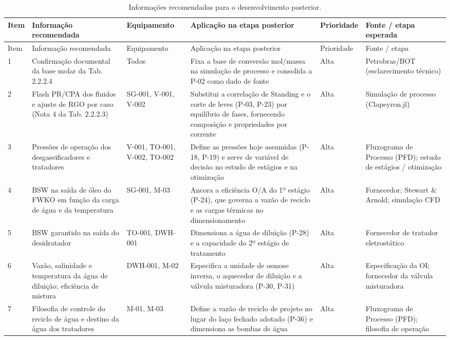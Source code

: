 \documentclass[11pt,a4paper]{article}
\numberwithin{equation}{section}
\numberwithin{table}{section}
\numberwithin{figure}{section}
\begin{document}
\begin{landscape}\small
\begin{longtable}{lL{6.0cm}L{2.9cm}L{5.2cm}lL{4.2cm}}
\caption{Informações recomendadas para o desenvolvimento posterior.}\label{tab:info}\\\toprule
Item & Informação recomendada & Equipamento & Aplicação na etapa posterior & Prioridade & Fonte / etapa esperada\\\midrule\endfirsthead
\toprule Item & Informação recomendada & Equipamento & Aplicação na etapa posterior & Prioridade & Fonte / etapa\\\midrule\endhead

1 & Confirmação documental da base molar da Tab. 2.2.2.4 & Todos & Fixa a base de conversão mol/massa na simulação de processo e consolida a P-02 como dado de fonte & Alta & Petrobras/BOT (esclarecimento técnico)\\
2 & Flash PR/CPA dos fluidos e ajuste de RGO por caso (Nota 4 da Tab. 2.2.2.3) & SG-001, V-001, V-002 & Substitui a correlação de Standing e o corte de leves (P-03, P-23) por equilíbrio de fases, fornecendo composição e propriedades por corrente & Alta & Simulação de processo (Clapeyron.jl)\\
3 & Pressões de operação dos desgaseificadores e tratadores & V-001, TO-001, V-002, TO-002 & Define as pressões hoje assumidas (P-18, P-19) e serve de variável de decisão no estudo de estágios e na otimização & Alta & Fluxograma de Processo (PFD); estudo de estágios / otimização\\
4 & BSW na saída de óleo do FWKO em função da carga de água e da temperatura & SG-001, M-03 & Ancora a eficiência O/A do 1º estágio (P-24), que governa a vazão de reciclo e as cargas térmicas no dimensionamento & Alta & Fornecedor; Stewart \& Arnold; simulação CFD\\
5 & BSW garantido na saída do desidratador & TO-001, DWH-001 & Dimensiona a água de diluição (P-28) e a capacidade do 2º estágio de tratamento & Alta & Fornecedor de tratador eletrostático\\
6 & Vazão, salinidade e temperatura da água de diluição; eficiência de mistura & DWH-001, M-02 & Especifica a unidade de osmose inversa, o aquecedor de diluição e a válvula misturadora (P-30, P-31) & Alta & Especificação da OI; fornecedor da válvula misturadora\\
7 & Filosofia de controle do reciclo de água e destino da água dos tratadores & M-01, M-03 & Define a vazão de reciclo de projeto no lugar do laço fechado adotado (P-36) e dimensiona as bombas de água & Alta & Fluxograma de Processo (PFD); filosofia de operação\\

\end{longtable}
\end{landscape}
\end{document}
